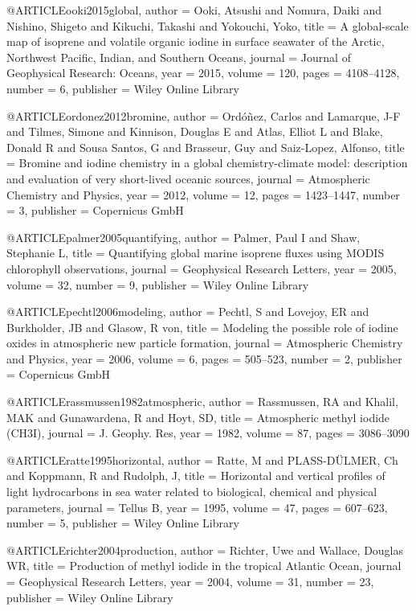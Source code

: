 @ARTICLE{ooki2015global,
  author = {Ooki, Atsushi and Nomura, Daiki and Nishino, Shigeto and Kikuchi,
	Takashi and Yokouchi, Yoko},
  title = {A global-scale map of isoprene and volatile organic iodine in surface
	seawater of the Arctic, Northwest Pacific, Indian, and Southern Oceans},
  journal = {Journal of Geophysical Research: Oceans},
  year = {2015},
  volume = {120},
  pages = {4108--4128},
  number = {6},
  publisher = {Wiley Online Library}
}

@ARTICLE{ordonez2012bromine,
  author = {Ord{\'o}{\~n}ez, Carlos and Lamarque, J-F and Tilmes, Simone and
	Kinnison, Douglas E and Atlas, Elliot L and Blake, Donald R and Sousa
	Santos, G and Brasseur, Guy and Saiz-Lopez, Alfonso},
  title = {Bromine and iodine chemistry in a global chemistry-climate model:
	description and evaluation of very short-lived oceanic sources},
  journal = {Atmospheric Chemistry and Physics},
  year = {2012},
  volume = {12},
  pages = {1423--1447},
  number = {3},
  publisher = {Copernicus GmbH}
}

@ARTICLE{palmer2005quantifying,
  author = {Palmer, Paul I and Shaw, Stephanie L},
  title = {Quantifying global marine isoprene fluxes using MODIS chlorophyll
	observations},
  journal = {Geophysical Research Letters},
  year = {2005},
  volume = {32},
  number = {9},
  publisher = {Wiley Online Library}
}

@ARTICLE{pechtl2006modeling,
  author = {Pechtl, S and Lovejoy, ER and Burkholder, JB and Glasow, R von},
  title = {Modeling the possible role of iodine oxides in atmospheric new particle
	formation},
  journal = {Atmospheric Chemistry and Physics},
  year = {2006},
  volume = {6},
  pages = {505--523},
  number = {2},
  publisher = {Copernicus GmbH}
}

@ARTICLE{rassmussen1982atmospheric,
  author = {Rassmussen, RA and Khalil, MAK and Gunawardena, R and Hoyt, SD},
  title = {Atmospheric methyl iodide (CH3I)},
  journal = {J. Geophy. Res},
  year = {1982},
  volume = {87},
  pages = {3086--3090}
}

@ARTICLE{ratte1995horizontal,
  author = {Ratte, M and PLASS-D{\"U}LMER, Ch and Koppmann, R and Rudolph, J},
  title = {Horizontal and vertical profiles of light hydrocarbons in sea water
	related to biological, chemical and physical parameters},
  journal = {Tellus B},
  year = {1995},
  volume = {47},
  pages = {607--623},
  number = {5},
  publisher = {Wiley Online Library}
}

@ARTICLE{richter2004production,
  author = {Richter, Uwe and Wallace, Douglas WR},
  title = {Production of methyl iodide in the tropical Atlantic Ocean},
  journal = {Geophysical Research Letters},
  year = {2004},
  volume = {31},
  number = {23},
  publisher = {Wiley Online Library}
}

